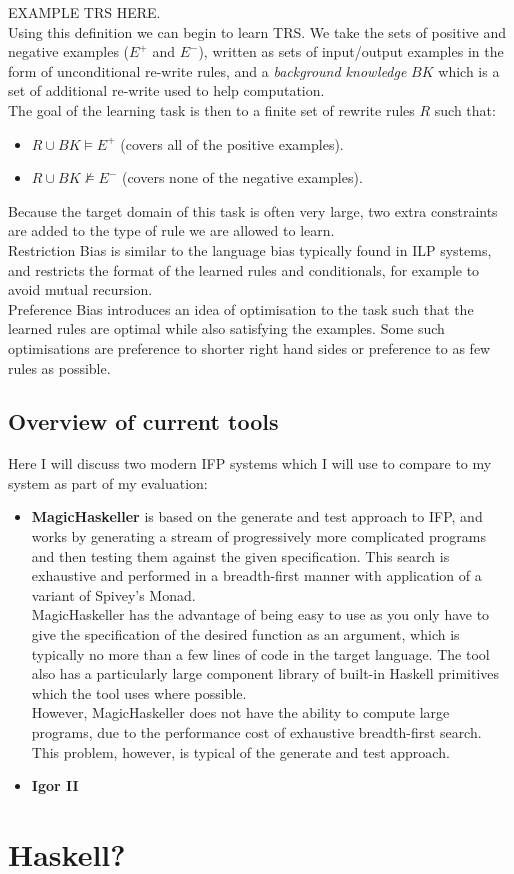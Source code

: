 EXAMPLE TRS HERE.\\

Using this definition we can begin to learn TRS. We take the sets of positive and negative examples ($E^+$ and $E^-$), written as sets of input/output examples in the form of unconditional re-write rules, and a \textit{background knowledge} $BK$ which is a set of additional re-write used to help computation. \\

The goal of the learning task is then to a finite set of rewrite rules $R$ such that:

\begin{itemize}
\item $R \cup BK \models E^+$ (covers all of the positive examples).
\item $R \cup BK \not \models E^-$ (covers none of the negative examples).
\end{itemize}

Because the target domain of this task is often very large, two extra constraints are added to the type of rule we are allowed to learn.\\
Restriction Bias is similar to the language bias typically found in ILP systems, and restricts the format of the learned rules and conditionals, for example to avoid mutual recursion. \\
Preference Bias introduces an idea of optimisation to the task such that the learned rules are optimal while also satisfying the examples. Some such optimisations are preference to shorter right hand sides or preference to as few rules as possible.

\subsection{Overview of current tools}

Here I will discuss two modern IFP systems which I will use to compare to my system as part of my evaluation:

\begin{itemize}
\item \textbf{MagicHaskeller} is based on the generate and test approach to IFP, and works by generating a stream of progressively more complicated programs and then testing them against the given specification. This search is exhaustive and performed in a breadth-first manner with application of a variant of Spivey's Monad.\\
MagicHaskeller has the advantage of being easy to use as you only have to give the specification of the desired function as an argument, which is typically no more than a few lines of code in the target language. The tool also has a particularly large component library of built-in Haskell primitives which the tool uses where possible.\\
However, MagicHaskeller does not have the ability to compute large programs, due to the performance cost of exhaustive breadth-first search. This problem, however, is typical of the generate and test approach.
\item \textbf{Igor II}
\end{itemize}

\section{Haskell?}

\pagebreak
\renewcommand\bibname{{References}}


